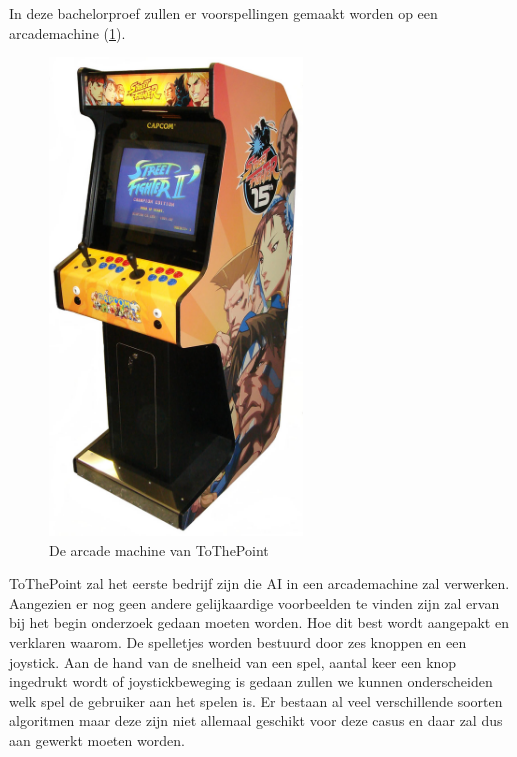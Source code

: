 In deze bachelorproef zullen er voorspellingen gemaakt worden op een arcademachine (\ref{fig:arcademachine}).
\begin{figure}
	\centering
	\includegraphics[width=0.6\textwidth]{img/arcademachine}
	\caption{De arcade machine van ToThePoint}
	\label{fig:arcademachine}
\end{figure} ToThePoint zal het eerste bedrijf zijn die AI in een arcademachine zal verwerken. Aangezien er nog geen andere gelijkaardige voorbeelden te vinden zijn zal ervan bij het begin onderzoek gedaan moeten worden. Hoe dit best wordt aangepakt en verklaren waarom. De spelletjes worden bestuurd door zes knoppen en een joystick. Aan de hand van de snelheid van een spel, aantal keer een knop ingedrukt wordt of joystickbeweging is gedaan zullen we kunnen onderscheiden welk spel de gebruiker aan het spelen is. Er bestaan al veel verschillende soorten algoritmen maar deze zijn niet allemaal geschikt voor deze casus en daar zal dus aan gewerkt moeten worden. 

